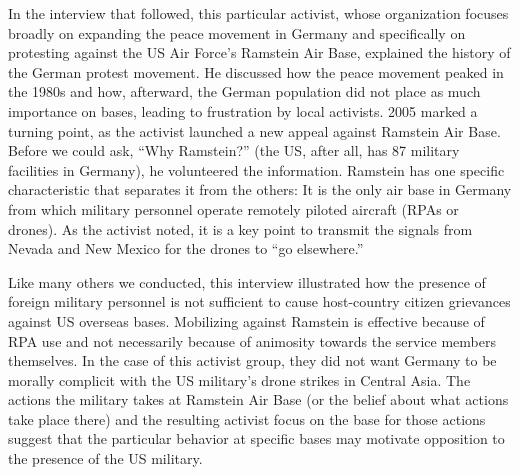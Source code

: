 In the interview that followed, this particular activist, whose organization focuses broadly on expanding the peace movement in Germany and specifically on protesting against the US Air Force's Ramstein Air Base, explained the history of the German protest movement. He discussed how the peace movement peaked in the 1980s and how, afterward, the German population did not place as much importance on bases, leading to frustration by local activists. 2005 marked a turning point, as the activist launched a new appeal against Ramstein Air Base. Before we could ask, ``Why Ramstein?'' (the US, after all, has 87 military facilities in Germany),\cite{DOD2018} he volunteered the information. Ramstein has one specific characteristic that separates it from the others: It is the only air base in Germany from which military personnel operate remotely piloted aircraft (RPAs or drones). As the activist noted, it is a key point to transmit the signals from Nevada and New Mexico for the drones to ``go elsewhere.''\cite{berlinone20190723} 

Like many others we conducted, this interview illustrated how the presence of foreign military personnel is not sufficient to cause host-country citizen grievances against US overseas bases. Mobilizing against Ramstein is effective because of RPA use and not necessarily because of animosity towards the service members themselves. In the case of this activist group, they did not want Germany to be morally complicit with the US military's drone strikes in Central Asia. The actions the military takes at Ramstein Air Base (or the belief about what actions take place there) and the resulting activist focus on the base for those actions suggest that the particular behavior at specific bases may motivate opposition to the presence of the US military. 

